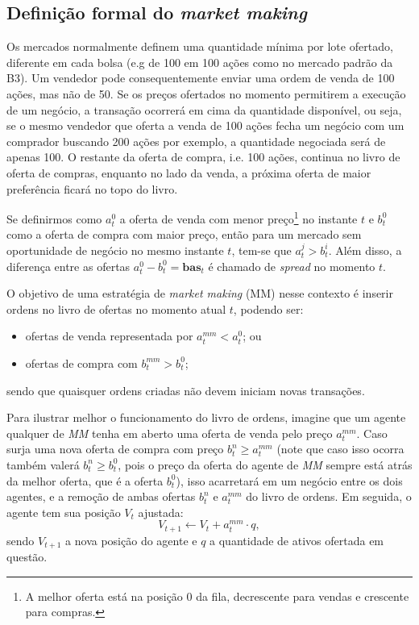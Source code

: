 \subsection{Definição formal do \textit{market making}}

Os mercados normalmente definem uma quantidade mínima por lote ofertado, diferente em cada bolsa (e.g de 100 em 100 ações como no mercado padrão da B3). Um vendedor pode consequentemente enviar uma ordem de venda de 100 ações, mas não de 50. Se os preços ofertados no momento permitirem a execução de um negócio, a transação ocorrerá em cima da quantidade disponível, ou seja, se o mesmo vendedor que oferta a venda de 100 ações fecha um negócio com um comprador buscando 200 ações por exemplo, a quantidade negociada será de apenas 100. O restante da oferta de compra, i.e. 100 ações, continua no livro de oferta de compras, enquanto no lado da venda, a próxima oferta de maior preferência ficará no topo do livro. 

Se definirmos como $a^{0}_{t}$ a oferta de venda com menor preço\footnote{A melhor oferta está na posição 0 da fila, decrescente para vendas e crescente para compras.} no instante $t$ e $b^{0}_{t}$ como a oferta de compra com maior preço, então para um mercado sem oportunidade de negócio no mesmo instante $t$, tem-se que $a^{j}_{t} > b^{i}_{t}$. Além disso, a diferença entre as ofertas $a^{0}_{t} - b^{0}_{t} = \mathbf{bas}_t$ é chamado de \textit{spread} no momento $t$.

O objetivo de uma estratégia de \textit{market making} (MM) nesse contexto é inserir ordens no livro de ofertas no momento atual $t$, podendo ser: 

\begin{itemize}
    \item ofertas de venda representada por $a^{mm}_{t} < a^{0}_{t}$; ou 
    \item ofertas de compra com $b^{mm}_{t} > b^{0}_{t}$;
\end{itemize}
sendo que quaisquer ordens criadas não devem iniciam novas transações.

Para ilustrar melhor o funcionamento do livro de ordens, imagine que um agente qualquer de \textit{MM} tenha em aberto uma oferta de venda pelo preço $a^{mm}_{t}$. Caso surja uma nova oferta de compra com preço $b^{n}_{t} \geq a^{mm}_{t}$ (note que caso isso ocorra também valerá $b^{n}_{t} \geq b^{0}_{t}$, pois o preço da oferta do agente de \textit{MM} sempre está atrás da melhor oferta, que é a oferta $b_{t}^{0}$), isso acarretará em um negócio entre os dois agentes, e a remoção de ambas ofertas $b_{t}^{n} \text{ e } a_{t}^{mm}$ do livro de ordens. Em seguida, o agente tem sua posição $V_{t}$ ajustada:
\begin{equation}
    V_{t + 1} \leftarrow V_{t} + a^{mm}_{t}\cdot q,
\end{equation}
sendo $V_{t + 1}$ a nova posição do agente e $q$ a quantidade de ativos ofertada em questão.

